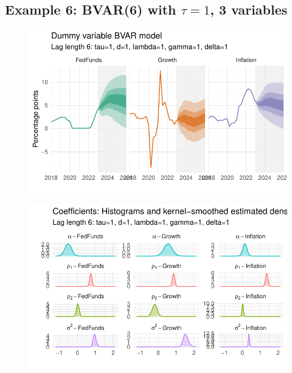 \documentclass[
  letterpaper,
]{book}
\begin{document}
\hypertarget{example-6-bvar6-with-tau1-3-variables}{%
\subsection{\texorpdfstring{Example 6: BVAR(6) with \(\tau=1\), 3
variables}{Example 6: BVAR(6) with \textbackslash tau=1, 3 variables}}\label{example-6-bvar6-with-tau1-3-variables}}

\begin{figure}

{\centering \includegraphics{BVAR_files/figure-pdf/estim-1.pdf}

}

\end{figure}

\begin{figure}

{\centering \includegraphics{BVAR_files/figure-pdf/unnamed-chunk-14-1.pdf}

}

\end{figure}
\end{document}
